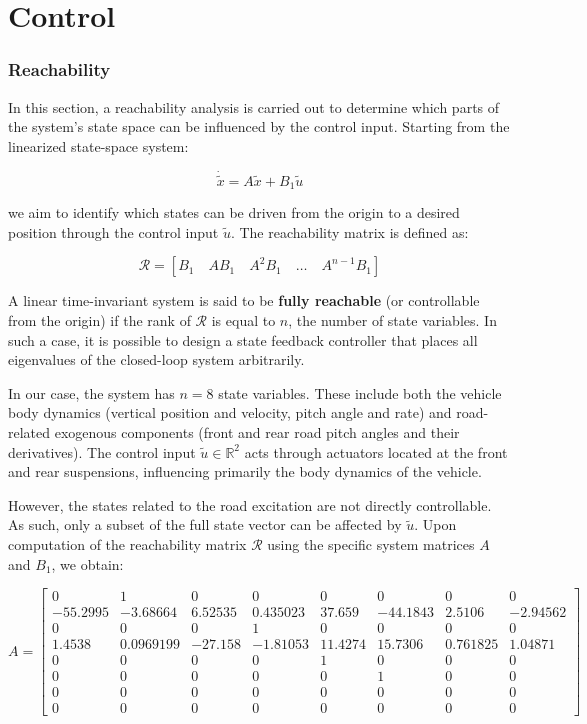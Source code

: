 \documentclass[]{report}
\begin{document}
	
	
	\newpage
	\section{Control}
	
	\subsubsection{Reachability}
	
	
	
	
	In this section, a reachability analysis is carried out to determine which parts of the system's state space can be influenced by the control input. Starting from the linearized state-space system:
	
	\[
	\dot{\tilde{x}} = A \tilde{x} + B_1 \tilde{u}
	\]
	
	we aim to identify which states can be driven from the origin to a desired position through the control input $\tilde{u}$. The reachability matrix is defined as:
	
	\[
	\mathcal{R} = \left[ B_1 \quad AB_1 \quad A^2B_1 \quad \dots \quad A^{n-1}B_1 \right]
	\]
	
	A linear time-invariant system is said to be \textbf{fully reachable} (or controllable from the origin) if the rank of $\mathcal{R}$ is equal to $n$, the number of state variables. In such a case, it is possible to design a state feedback controller that places all eigenvalues of the closed-loop system arbitrarily.
	
	
	In our case, the system has $n = 8$ state variables. These include both the vehicle body dynamics (vertical position and velocity, pitch angle and rate) and road-related exogenous components (front and rear road pitch angles and their derivatives). The control input $\tilde{u} \in \mathbb{R}^2$ acts through actuators located at the front and rear suspensions, influencing primarily the body dynamics of the vehicle.
	
	However, the states related to the road excitation are not directly controllable. As such, only a subset of the full state vector can be affected by $\tilde{u}$. Upon computation of the reachability matrix $\mathcal{R}$ using the specific system matrices $A$ and $B_1$, we obtain:
	
	
	\[
	A =
	\begin{bmatrix}
		0 & 1 & 0 & 0 & 0 & 0 & 0 & 0 \\
		-55.2995 & -3.68664 & 6.52535 & 0.435023 & 37.659 & -44.1843 & 2.5106 & -2.94562 \\
		0 & 0 & 0 & 1 & 0 & 0 & 0 & 0 \\
		1.4538 & 0.0969199 & -27.158 & -1.81053 & 11.4274 & 15.7306 & 0.761825 & 1.04871 \\
		0 & 0 & 0 & 0 & 1 & 0 & 0 & 0 \\
		0 & 0 & 0 & 0 & 0 & 1 & 0 & 0 \\
		0 & 0 & 0 & 0 & 0 & 0 & 0 & 0 \\
		0 & 0 & 0 & 0 & 0 & 0 & 0 & 0 
	\end{bmatrix}
	\]
	
\end{document}
